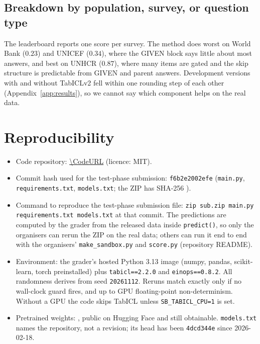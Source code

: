 \documentclass{article}
\begin{document}
\subsection{Breakdown by population, survey, or question type}
The leaderboard reports one score per survey. The method does worst on World
Bank ($0.23$) and UNICEF ($0.34$), where the GIVEN block says little about most
answers, and best on UNHCR ($0.87$), where many items are gated and the skip
structure is predictable from GIVEN and parent answers. Development versions
with and without TabICLv2 fell within one rounding step of each other
(Appendix~\ref{app:results}), so we cannot say which component helps on the
real data.

\section{Reproducibility}
\label{sec:repro}

\begin{itemize}[leftmargin=*]
  \item Code repository: \url{\CodeURL} (licence: MIT).
  \item Commit hash used for the test-phase submission: \texttt{f6b2e2002efe}
    (\texttt{main.py}, \texttt{requirements.txt}, \texttt{models.txt}; the ZIP
    has SHA-256 \texttt{}).
  \item Command to reproduce the test-phase submission file:
    \texttt{zip sub.zip main.py requirements.txt models.txt} at that commit.
    The predictions are computed by the grader from the released data inside
    \texttt{predict()}, so only the organisers can rerun the ZIP on the real
    data; others can run it end to end with the organisers'
    \texttt{make\_sandbox.py} and \texttt{score.py} (repository README).
  \item Environment: the grader's hosted Python 3.13 image (numpy, pandas,
    scikit-learn, torch preinstalled) plus \texttt{tabicl==2.2.0} and
    \texttt{einops==0.8.2}. All randomness derives from seed \texttt{20261112}.
    Reruns match exactly only if no wall-clock guard fires, and up to GPU
    floating-point non-determinism. Without a GPU the code skips TabICL unless
    \texttt{SB\_TABICL\_CPU=1} is set.
  \item Pretrained weights: \TabICLUsed, public on Hugging Face and still
    obtainable. \texttt{models.txt} names the repository, not a revision; its
    head has been \texttt{4dcd344e} since 2026-02-18.
\end{itemize}
\end{document}
